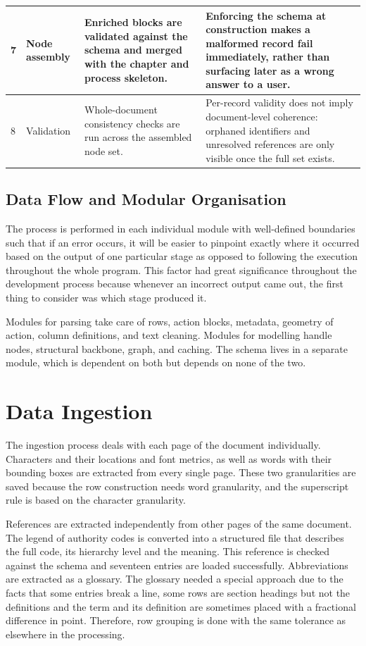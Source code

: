 \begin{longtable}{|p{}|p{}|p{}|p{}|}
7 & Node assembly & Enriched blocks are validated against the schema and merged with the chapter and process skeleton. & Enforcing the schema at construction makes a malformed record fail immediately, rather than surfacing later as a wrong answer to a user. \\ \hline
8 & Validation & Whole-document consistency checks are run across the assembled node set. & Per-record validity does not imply document-level coherence: orphaned identifiers and unresolved references are only visible once the full set exists. \\ \hline
\end{longtable}

\subsection{Data Flow and Modular Organisation}

The process is performed in each individual module with well-defined boundaries such that if an error occurs, it will be easier to pinpoint exactly where it occurred based on the output of one particular stage as opposed to following the execution throughout the whole program. This factor had great significance throughout the development process because whenever an incorrect output came out, the first thing to consider was which stage produced it.

Modules for parsing take care of rows, action blocks, metadata, geometry of action, column definitions, and text cleaning. Modules for modelling handle nodes, structural backbone, graph, and caching. The schema lives in a separate module, which is dependent on both but depends on none of the two.

\section{Data Ingestion}

The ingestion process deals with each page of the document individually. Characters and their locations and font metrics, as well as words with their bounding boxes are extracted from every single page. These two granularities are saved because the row construction needs word granularity, and the superscript rule is based on the character granularity.

References are extracted independently from other pages of the same document. The legend of authority codes is converted into a structured file that describes the full code, its hierarchy level and the meaning. This reference is checked against the schema and seventeen entries are loaded successfully. Abbreviations are extracted as a glossary. The glossary needed a special approach due to the facts that some entries break a line, some rows are section headings but not the definitions and the term and its definition are sometimes placed with a fractional difference in point. Therefore, row grouping is done with the same tolerance as elsewhere in the processing.

